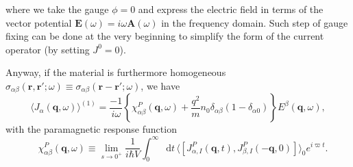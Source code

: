 \documentclass[10pt,nofootinbib,letterpaper]{revtex4}
\newcommand*\dd{\mathop{}\!\mathrm{d}}
\begin{document}
		where we take the gauge $\phi=0$ and express the electric field in terms of the vector potential $\bm{E}(\omega)=i\omega\bm{A}(\omega)$ in the frequency domain. Such step of gauge fixing can be done at the very beginning to simplify the form of the current operator (by setting $J^0=0$).\par
		Anyway, if the material is furthermore homogeneous $\sigma_{\alpha\beta}(\bm{r},\bm{r'};\omega)\equiv\sigma_{\alpha\beta}(\bm{r}-\bm{r'};\omega)$, we have
		\begin{equation}\label{1.3.9}
			\langle J_\alpha(\bm{q},\omega)\rangle^{(1)}=\dfrac{-1}{i\omega}\left\{\chi^P_{\alpha\beta}(\bm{q},\omega)+\dfrac{q^2}{m}n_0\delta_{\alpha\beta}(1-\delta_{\alpha0})\right\}E^\beta(\bm{q},\omega),
		\end{equation}
		with the paramagnetic response function
		\begin{equation}\label{1.3.10}
			\quad\chi_{\alpha\beta}^P(\bm{q},\omega)\equiv\lim_{s\rightarrow0^+}\dfrac{1}{i\hbar V}\int_0^\infty\dd t\,\langle[J^P_{\alpha,I}(\bm{q},t),J^P_{\beta,I}(-\bm{q},0)]\rangle_0 e^{i\varpi t}.
		\end{equation}
	
\end{document}
